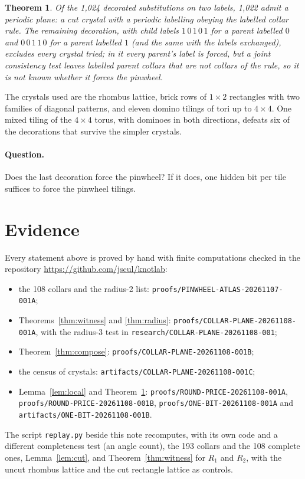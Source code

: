 \documentclass[11pt]{article}
\newtheorem{theorem}{Theorem}
\theoremstyle{definition}
\theoremstyle{remark}
\begin{document}
\begin{theorem}\label{thm:onebit}
Of the 1{,}024 decorated substitutions on two labels, 1{,}022 admit a periodic
plane: a cut crystal with a periodic labelling obeying the labelled collar rule.
The remaining decoration, with child labels $1\,0\,1\,0\,1$ for a parent
labelled $0$ and $0\,0\,1\,1\,0$ for a parent labelled $1$ (and the same with
the labels exchanged), excludes every crystal tried; in it every parent's label
is forced, but a joint consistency test leaves labelled parent collars that are
not collars of the rule, so it is not known whether it forces the pinwheel.
\end{theorem}

The crystals used are the rhombus lattice, brick rows of $1\times2$ rectangles
with two families of diagonal patterns, and eleven domino tilings of tori up to
$4\times4$. One mixed tiling of the $4\times4$ torus, with dominoes in both
directions, defeats six of the decorations that survive the simpler crystals.

\paragraph{Question.} Does the last decoration force the pinwheel? If it does,
one hidden bit per tile suffices to force the pinwheel tilings.

\section{Evidence}\label{sec:evidence}

Every statement above is proved by hand with finite computations checked in
the repository \url{https://github.com/jscul/knotlab}:
\begin{itemize}
\item the 108 collars and the radius-2 list:
\texttt{proofs/PINWHEEL-ATLAS-20261107-001A};
\item Theorems~\ref{thm:witness} and \ref{thm:radius}:
\texttt{proofs/COLLAR-PLANE-20261108-001A}, with the radius-3 test in
\texttt{research/COLLAR-PLANE-20261108-001};
\item Theorem~\ref{thm:compose}: \texttt{proofs/COLLAR-PLANE-20261108-001B};
\item the census of crystals: \texttt{artifacts/COLLAR-PLANE-20261108-001C};
\item Lemma~\ref{lem:local} and Theorem~\ref{thm:onebit}:
\texttt{proofs/ROUND-PRICE-20261108-001A}, \texttt{proofs/ROUND-PRICE-20261108-001B},
\texttt{proofs/ONE-BIT-20261108-001A} and
\texttt{artifacts/ONE-BIT-20261108-001B}.
\end{itemize}
The script \texttt{replay.py} beside this note recomputes, with its own code and
a different completeness test (an angle count), the 193 collars and the 108
complete ones, Lemma~\ref{lem:cut}, and Theorem~\ref{thm:witness} for $R_1$
and $R_2$, with the uncut rhombus lattice and the cut rectangle lattice as
controls.
\end{document}
